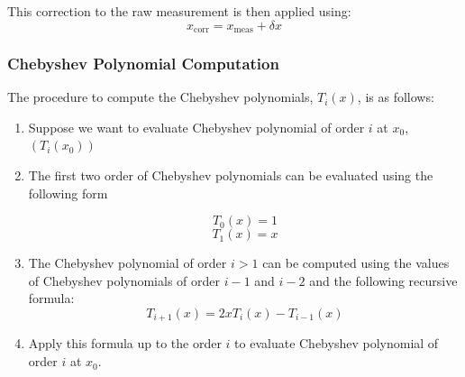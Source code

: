 This correction to the raw measurement is then applied using:
\begin{equation}
x_{\text{corr}} = x_{\text{meas}} + \delta x
\end{equation}

\subsubsection{Chebyshev Polynomial Computation\cite{Chebyshev}}
The procedure to compute the Chebyshev polynomials, $T_i(x)$, is as follows:
\begin{enumerate}
\item Suppose we want to evaluate Chebyshev polynomial of order $i$ at $x_0$, $(T_i(x_0))$
\item The first two order of Chebyshev polynomials can be evaluated using the following form

\begin{equation}
T_0(x) = 1 
\end{equation}
\begin{equation}
T_1(x) = x
\end{equation}

\item The Chebyshev polynomial of order $i > 1$ can be computed using the values of Chebyshev polynomials of order $i-1$ and $i-2$ and the following recursive formula:
\begin{equation}
T_{i+1}(x) = 2xT_i(x) - T_{i-1}(x)
\end{equation}
\item Apply this formula up to the order $i$ to evaluate Chebyshev polynomial of order $i$ at $x_0$. 
\end{enumerate}





